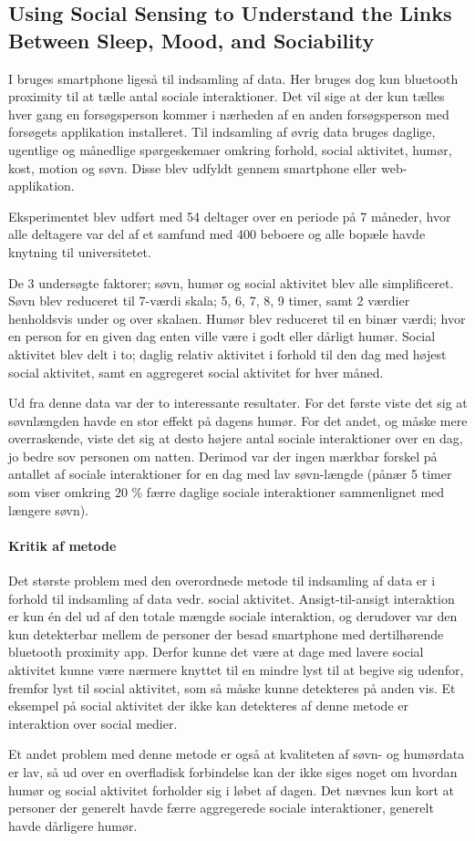 \subsection{Using Social Sensing to Understand the Links Between Sleep, Mood, and Sociability}
I \citet{social_sensing_2} bruges smartphone ligeså til indsamling af data.
Her bruges dog kun bluetooth proximity til at tælle antal sociale interaktioner.
Det vil sige at der kun tælles hver gang en forsøgsperson kommer i nærheden af en anden forsøgsperson med forsøgets applikation installeret.
Til indsamling af øvrig data bruges daglige, ugentlige og månedlige spørgeskemaer omkring forhold, social aktivitet, humør, kost, motion og søvn.
Disse blev udfyldt gennem smartphone eller web-applikation.

Eksperimentet blev udført med 54 deltager over en periode på 7 måneder, hvor alle deltagere var del af et samfund med 400 beboere og alle bopæle havde knytning til universitetet.

De 3 undersøgte faktorer; søvn, humør og social aktivitet blev alle simplificeret.
Søvn blev reduceret til 7-værdi skala; 5, 6, 7, 8, 9 timer, samt 2 værdier henholdsvis under og over skalaen.
Humør blev reduceret til en binær værdi; hvor en person for en given dag enten ville være i godt eller dårligt humør.
Social aktivitet blev delt i to; daglig relativ aktivitet i forhold til den dag med højest social aktivitet, samt en aggregeret social aktivitet for hver måned.

Ud fra denne data var der to interessante resultater.
For det første viste det sig at søvnlængden havde en stor effekt på dagens humør.
For det andet, og måske mere overraskende, viste det sig at desto højere antal sociale interaktioner over en dag, jo bedre sov personen om natten.
Derimod var der ingen mærkbar forskel på antallet af sociale interaktioner for en dag med lav søvn-længde (pånær 5 timer som viser omkring 20 \% færre daglige sociale interaktioner sammenlignet med længere søvn).

\paragraph{Kritik af metode}
Det største problem med den overordnede metode til indsamling af data er i forhold til indsamling af data vedr. social aktivitet.
Ansigt-til-ansigt interaktion er kun én del ud af den totale mængde sociale interaktion, og derudover var den kun detekterbar mellem de personer der besad smartphone med dertilhørende bluetooth proximity app.
Derfor kunne det være at dage med lavere social aktivitet kunne være nærmere knyttet til en mindre lyst til at begive sig udenfor, fremfor lyst til social aktivitet, som så måske kunne detekteres på anden vis.
Et eksempel på social aktivitet der ikke kan detekteres af denne metode er interaktion over social medier.

Et andet problem med denne metode er også at kvaliteten af søvn- og humørdata er lav, så ud over en overfladisk forbindelse kan der ikke siges noget om hvordan humør og social aktivitet forholder sig i løbet af dagen.
Det nævnes kun kort at personer der generelt havde færre aggregerede sociale interaktioner, generelt havde dårligere humør.
